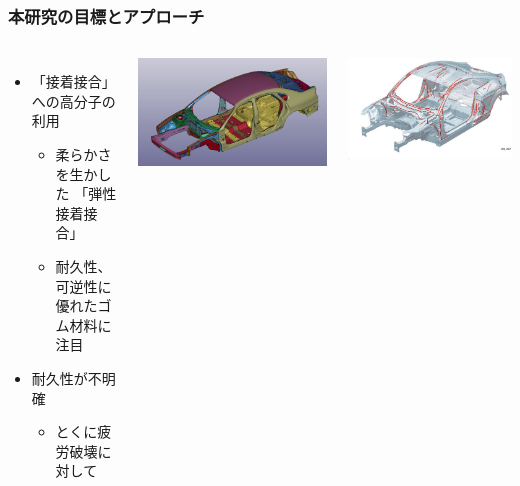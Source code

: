\documentclass[12pt, dvipdfmx]{beamer}
\begin{document}
\begin{frame}
    \frametitle{本研究の目標とアプローチ}
		\begin{columns}[T, onlytextwidth]
			\begin{itemize}
				\item {\color{red} 「接着接合」}への高分子の利用
					\begin{itemize}
						\normalsize
						\item 柔らかさを生かした{\color{red} 「弾性接着接合」}
						\item 耐久性、可逆性に優れた\alert{ゴム材料に注目}
					\end{itemize}
				\item {\color{blue}耐久性が不明確}
					\begin{itemize}
						\normalsize
						\item とくに疲労破壊に対して
					\end{itemize}
			\end{itemize}
					\centering
						\includegraphics[width=\textwidth]{adhesive_car2.png}

						\vspace{5mm}
						\includegraphics[width=\textwidth]{adhesive_car.png}
				

\end{columns}
\end{frame}
\end{document}
